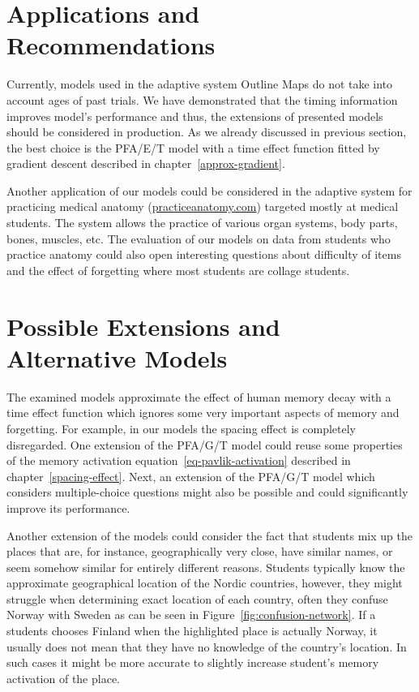 \section{Applications and Recommendations}

Currently, models used in the adaptive system Outline Maps do not take into account ages of past trials. We have demonstrated that the timing information improves model's performance and thus, the extensions of presented models should be considered in production. As we already discussed in previous section, the best choice is the PFA/E/T model with a time effect function fitted by gradient descent described in chapter~\ref{approx-gradient}.

Another application of our models could be considered in the adaptive system for practicing medical anatomy (\url{practiceanatomy.com}) targeted mostly at medical students. The system allows the practice of various organ systems, body parts, bones, muscles, etc. The evaluation of our models on data from students who practice anatomy could also open interesting questions about difficulty of items and the effect of forgetting where most students are collage students.

\section{Possible Extensions and Alternative Models}

The examined models approximate the effect of human memory decay with a time effect function which ignores some very important aspects of memory and forgetting. For example, in our models the spacing effect is completely disregarded. One extension of the PFA/G/T model could reuse some properties of the memory activation equation~\ref{eq-pavlik-activation} described in chapter~\ref{spacing-effect}. Next, an extension of the PFA/G/T model which considers multiple-choice questions might also be possible and could significantly improve its performance.

Another extension of the models could consider the fact that students mix up the places that are, for instance, geographically very close, have similar names, or seem somehow similar for entirely different reasons. Students typically know the approximate geographical location of the Nordic countries, however, they might struggle when determining exact location of each country, often they confuse Norway with Sweden as can be seen in Figure~\ref{fig:confusion-network}. If a students chooses Finland when the highlighted place is actually Norway, it usually does not mean that they have no knowledge of the country's location. In such cases it might be more accurate to slightly increase student's memory activation of the place.

